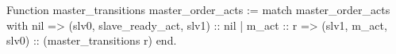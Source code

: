 Function master_transitions master_order_acts :=
  match master_order_acts with
    nil        => (slv0, slave_ready_act, slv1) :: nil
  | m_act :: r => (slv1, m_act, slv0) :: (master_transitions  r)
  end.